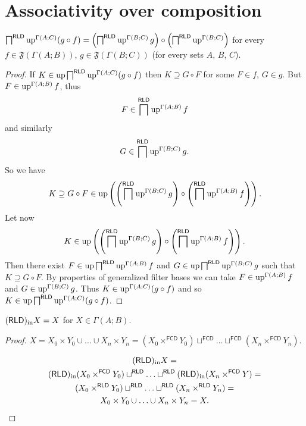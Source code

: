 \section{Associativity over composition}
\begin{lem}
\label{uparr-gamma-comp}$\bigsqcap^{\mathsf{RLD}}\operatorname{up}^{\Gamma(A;C)}(g\circ f)=\left(\bigsqcap^{\mathsf{RLD}}\operatorname{up}^{\Gamma(B;C)}g\right)\circ\left(\bigsqcap^{\mathsf{RLD}}\operatorname{up}^{\Gamma(B;C)}\right)$
for every $f\in\mathfrak{F}(\Gamma(A;B))$, $g\in\mathfrak{F}(\Gamma(B;C))$
(for every sets $A$, $B$, $C$).\end{lem}
\begin{proof}
If $K\in\operatorname{up}\bigsqcap^{\mathsf{RLD}}\operatorname{up}^{\Gamma(A;C)}(g\circ f)$ then
$K\supseteq G\circ F$ for some $F\in f$, $G\in g$. But $F\in\operatorname{up}^{\Gamma(A;B)}f$,
thus 
\[
F\in\bigsqcap^{\mathsf{RLD}}\operatorname{up}^{\Gamma(A;B)}f
\]
and similarly 
\[
G\in\bigsqcap^{\mathsf{RLD}}\operatorname{up}^{\Gamma(B;C)}g.
\]
So we have 
\[
K\supseteq G\circ F\in\operatorname{up}\left(\left(\bigsqcap^{\mathsf{RLD}}\operatorname{up}^{\Gamma(B;C)}g\right)\circ\left(\bigsqcap^{\mathsf{RLD}}\operatorname{up}^{\Gamma(A;B)}f\right)\right).
\]
Let now 
\[
K\in\operatorname{up}\left(\left(\bigsqcap^{\mathsf{RLD}}\operatorname{up}^{\Gamma(B;C)}g\right)\circ\left(\bigsqcap^{\mathsf{RLD}}\operatorname{up}^{\Gamma(A;B)}f\right)\right).
\]
Then there exist $F\in\operatorname{up}\bigsqcap^{\mathsf{RLD}}\operatorname{up}^{\Gamma(A;B)}f$
and $G\in\operatorname{up}\bigsqcap^{\mathsf{RLD}}\operatorname{up}^{\Gamma(B;C)}g$ such that
$K\supseteq G\circ F$. By properties of generalized filter bases
we can take $F\in\operatorname{up}^{\Gamma(A;B)}f$ and $G\in\operatorname{up}^{\Gamma(B;C)}g$.
Thus $K\in\operatorname{up}^{\Gamma(A;C)}(g\circ f)$ and so $K\in\operatorname{up}\bigsqcap^{\mathsf{RLD}}\operatorname{up}^{\Gamma(A;C)}(g\circ f)$.\end{proof}
\begin{lem}
$(\mathsf{RLD})_{\mathrm{in}} X=X$ for $X\in\Gamma(A;B)$.\end{lem}
\begin{proof}
$X=X_{0}\times Y_{0}\cup\ldots\cup X_{n}\times Y_{n}=(X_{0}\times^{\mathsf{FCD}}Y_{0})\sqcup^{\mathsf{FCD}}\ldots\sqcup^{\mathsf{FCD}}(X_{n}\times^{\mathsf{FCD}}Y_{n})$.

\begin{multline*}
(\mathsf{RLD})_{\mathrm{in}} X=\\
(\mathsf{RLD})_{\mathrm{in}}(X_{0}\times^{\mathsf{FCD}}Y_{0})\sqcup^{\mathsf{RLD}}\ldots\sqcup^{\mathsf{RLD}}(\mathsf{RLD})_{\mathrm{in}}(X_{n}\times^{\mathsf{FCD}}Y)=\\
(X_{0}\times^{\mathsf{RLD}}Y_{0})\sqcup^{\mathsf{RLD}}\ldots\sqcup^{\mathsf{RLD}}(X_{n}\times^{\mathsf{RLD}}Y_{n})=\\
X_{0}\times Y_{0}\cup\ldots\cup X_{n}\times Y_{n}=X.
\end{multline*}
\end{proof}
